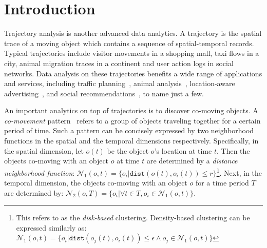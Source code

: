 \section{Introduction}
Trajectory analysis is another advanced data analytics. A trajectory is the spatial trace
of a moving object which contains a sequence of spatial-temporal records. Typical trajectories
include visitor movements in a shopping mall, taxi flows in a city, animal migration traces in a continent and user action logs in social networks.
Data analysis on these trajectories benefits a wide range of applications and services, including traffic planning~\cite{zheng2011urban}, animal analysis~\cite{li2010miningperiodic}, location-aware advertising~\cite{guo2016influence}, and social recommendations~\cite{bao2013survey}, to name just a few. 

An important analytics on top of trajectories is to discover co-moving objects. A \emph{co-movement} pattern~\cite{li2013onlinegroup,zheng2015trajectory,alamri2014taxonomy} 
refers to a group of objects traveling together for a certain period of time.
Such a pattern can be concisely expressed by two neighborhood functions in the spatial and the temporal dimensions respectively.
Specifically, in the spatial dimension, let $o(t)$ be the object $o$'s location at time $t$.
Then the objects co-moving with an object $o$
at time $t$ are determined by a 
\emph{distance neighborhood function}:
$\mathcal{N}_1(o,t) = \{o_i | \mathtt{dist}(o(t), o_i(t)) \leq r \}$\footnote{This refers to as the \emph{disk-based} clustering. Density-based clustering can be expressed similarly as: $\mathcal{N}_1(o,t) = \{o_i | \mathtt{dist}(o_j(t), o_i(t)) \leq \epsilon \wedge o_j \in \mathcal{N}_1(o,t) \}$}. Next, in the temporal dimension, the objects co-moving with an object $o$ for a time period $T$ are determined by: $\mathcal{N}_2(o, T) = \{o_i | \forall t \in T, o_i \in \mathcal{N}_1(o,t)\}$.
%
